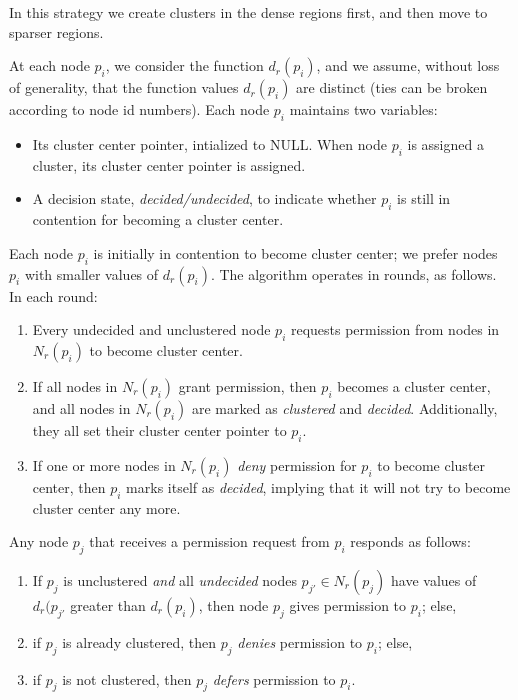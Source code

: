In this strategy we create clusters in the dense regions first, and then move to sparser regions. 

 At each node $p_i$, we consider the function $d_{r}(p_{i})$, and we assume, without loss of generality, that the function values $d_r(p_i)$ are distinct (ties can be broken according to node id numbers).
Each node $p_i$ maintains two variables:
\begin{itemize}
\item Its cluster center pointer, intialized to NULL. When node $p_i$ is assigned a cluster, its cluster center pointer is assigned. 
\item A decision state, {\em decided/undecided}, to indicate whether $p_i$ is still in contention for becoming a cluster center.
\end{itemize}
Each node $p_i$ is initially in contention to become cluster center; we prefer nodes $p_i$ with smaller values of $d_{r}(p_i)$. The algorithm operates in rounds, as follows. In each round:

\begin{enumerate}
\item Every undecided and unclustered node $p_i$ requests permission from nodes in $N_{r}(p_{i})$ to become cluster center.
\item If all nodes in $N_{r}(p_{i})$ grant permission, then $p_i$ becomes a cluster center, and all nodes in $N_{r}(p_{i})$ are marked as {\em clustered} and {\em decided}. Additionally, they all set their cluster center pointer to $p_i$. 
\item If one or more nodes in $N_{r}(p_{i})$ {\em deny} permission for $p_i$ to become cluster center, then $p_i$ marks itself as {\em decided}, implying that it will not try to become cluster center any more.
\end{enumerate}

Any node $p_j$ that receives a permission request from $p_i$ responds as follows:
\begin{enumerate}
\item  If $p_j$ is unclustered {\em and} all {\em undecided} nodes $p_{j'}\in N_{r}(p_{j})$ have values of $d_{r}(p_{j'}$ greater than $d_r(p_i)$, then node $p_j$ gives permission to $p_i$; else, 
\item if $p_j$ is already clustered, then $p_j$ {\em denies} permission to $p_i$; else, 
\item if $p_j$ is not clustered, then $p_j$ {\em defers} permission to $p_i$.
\end{enumerate}

